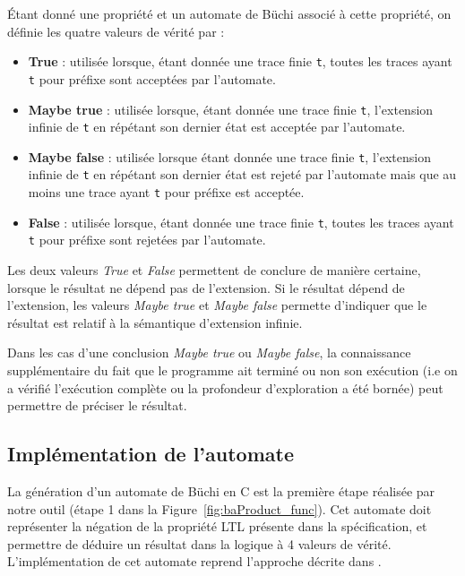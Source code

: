 Étant donné une propriété et un automate de Büchi associé à cette propriété, on
définie les quatre valeurs de vérité par :

\begin{itemize}
\item
  \textbf{True} : utilisée lorsque, étant donnée une trace finie \texttt{t},
  toutes les traces ayant \texttt{t} pour préfixe sont acceptées par
  l'automate.
\item
  \textbf{Maybe true} : utilisée lorsque, étant donnée une trace finie
  \texttt{t}, l'extension infinie de \texttt{t} en répétant son
  dernier état est acceptée par l'automate.
\item
  \textbf{Maybe false} : utilisée lorsque étant donnée une trace finie
  \texttt{t}, l'extension infinie de \texttt{t} en répétant son
  dernier état est rejeté par l'automate mais que au moins une trace
  ayant \texttt{t} pour préfixe est acceptée.
\item
  \textbf{False} : utilisée lorsque, étant donnée une trace finie \texttt{t},
  toutes les traces ayant \texttt{t} pour préfixe sont rejetées par
  l'automate.
\end{itemize}

Les deux valeurs \emph{True} et \emph{False} permettent de conclure de manière
certaine, lorsque le résultat ne dépend pas de l'extension. Si le résultat
dépend de l'extension, les valeurs \emph{Maybe true} et \emph{Maybe false}
permette d'indiquer que le résultat est relatif à la sémantique d'extension
infinie.

Dans les cas d'une conclusion \emph{Maybe true} ou \emph{Maybe false},
la connaissance supplémentaire du fait que le programme ait terminé ou
non son exécution (i.e on a vérifié l'exécution complète ou la
profondeur d'exploration a été bornée) peut permettre de préciser le
résultat.

\subsection{Implémentation de l'automate}

La génération d'un automate de Büchi en C est la première étape réalisée par
notre outil (étape 1 dans la Figure~\ref{fig:baProduct_func}). Cet automate doit
représenter la négation de la propriété \ac{LTL} présente dans la spécification,
et permettre de déduire un résultat dans la logique à 4 valeurs de vérité.
L'implémentation de cet automate reprend l'approche décrite dans
\cite{morse_ltl}.


